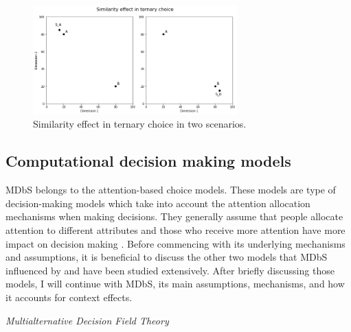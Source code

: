 \documentclass[a4paper,12pt]{article}
\begin{document}
\begin{figure}[h]
    \centering
    \includegraphics[width=0.7\textwidth]{staticFiles/SimilarityEffect.png}
    \caption{Similarity effect in ternary choice in two scenarios.} %
    \label{fig:similarityEffect} %

\end{figure}


\subsection{Computational decision making models}

MDbS belongs to the attention-based choice models. These models are type of decision-making models which take into account the attention allocation mechanisms when making decisions. They generally assume that people allocate attention to different attributes and those who receive more attention have more impact on decision making \citep{gabaix2000boundedly}. Before commencing with its underlying mechanisms and assumptions, it is beneficial to discuss the other two models that MDbS influenced by and have been studied extensively. After briefly discussing those models, I will continue with MDbS, its main assumptions, mechanisms, and how it accounts for context effects.

\textit{Multialternative Decision Field Theory}
\end{document}

